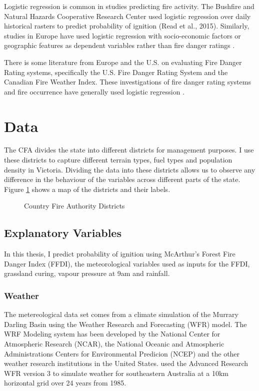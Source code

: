 \documentclass{article}
\begin{document}
Logistic regression is common in studies predicting fire activity. The Bushfire and Natural Hazards Cooperative Research Center used logistic regression over daily historical rasters to predict probability of ignition (Read et al., 2015). Similarly, studies in Europe have used logistic regression with socio-economic factors or geographic features as dependent variables rather than fire danger ratings \citep{del11, zhang13}. 

There is some literature from Europe and the U.S. on evaluating Fire Danger Rating systems, specifically the U.S. Fire Danger Rating System and the Canadian Fire Weather Index.  These investigations of fire danger rating systems and fire occurrence have  generally used logistic regression \citep{andrews03, padilla11}. 

\section{Data}

The CFA divides the state into different districts for management purposes. I use these districts to capture different terrain types, fuel types and population density in Victoria. Dividing the data into these districts allows us to observe any difference in the behaviour of the variables across different parts of the state. Figure \ref{fig:dist} shows a map of the districts and their labels. 

\begin{figure}[h]
	\centering 
	\caption{Country Fire Authority Districts} 
	\label{fig:dist} 
\end{figure}

\subsection{Explanatory Variables}

In this thesis, I predict probability of ignition using McArthur's Forest Fire Danger Index (FFDI), the meteorological variables used as inputs for the FFDI, grassland curing, vapour pressure at 9am and rainfall.  

\subsubsection{Weather}

The metereological data set comes from a climate simulation of the Murrary Darling Basin using the Weather Research and Forecasting (WFR) model. The WRF Modeling system has been developed by the National Center for Atmospheric Research (NCAR), the National Oceanic and Atmospheric Administrations Centers for Environmental Predicion (NCEP) and the other weather research institutions in the United States. \citet{evans10} used the Advanced Research WFR version 3 \citep{skamarock08} to simulate weather for southeastern Australia at a 10km horizontal grid over 24 years from 1985.
\end{document}

